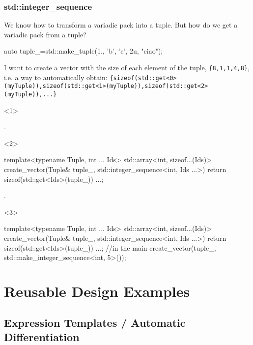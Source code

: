 \documentclass[aspectratio=43]{beamer}
\begin{document}
\begin{frame}[fragile]\frametitle{std::integer\_sequence}
  We know how to transform a variadic pack into a tuple. But how do we get a variadic pack \alert{from} a tuple?

\begin{Cpplisting}{}
auto tuple_=std::make_tuple(1., 'b', 'c', 2u, "ciao");
\end{Cpplisting}
I want to create a vector with the size of each element of the tuple, \verb~{8,1,1,4,8}~,
i.e. a way to automatically obtain:
{\tiny\verb~{sizeof(std::get<0>(myTuple)),sizeof(std::get<1>(myTuple)),sizeof(std::get<2>(myTuple)),...}~}

\begin{onlyenv}<1>
\begin{Cpplisting}{}







.
\end{Cpplisting}
\end{onlyenv}

\begin{onlyenv}<2>
\begin{Cpplisting}{}
template<typename Tuple, int ... Ids>
std::array<int, sizeof...(Ids)>
create_vector(Tuple& tuple_,
              std::integer_sequence<int, Ids ...>){
  return {sizeof(std::get<Ids>(tuple_)) ...};
}

.
\end{Cpplisting}
\end{onlyenv}

\begin{onlyenv}<3>
\begin{Cpplisting}{}
template<typename Tuple, int ... Ids>
std::array<int, sizeof...(Ids)>
create_vector(Tuple& tuple_,
              std::integer_sequence<int, Ids ...>){
  return {sizeof(std::get<Ids>(tuple_)) ...};
}
//in the main
create_vector(tuple_, std::make_integer_sequence<int, 5>());
\end{Cpplisting}
\end{onlyenv}
\end{frame}


\section{Reusable Design Examples}
\subsection{Expression Templates / Automatic Differentiation}
\end{document}
